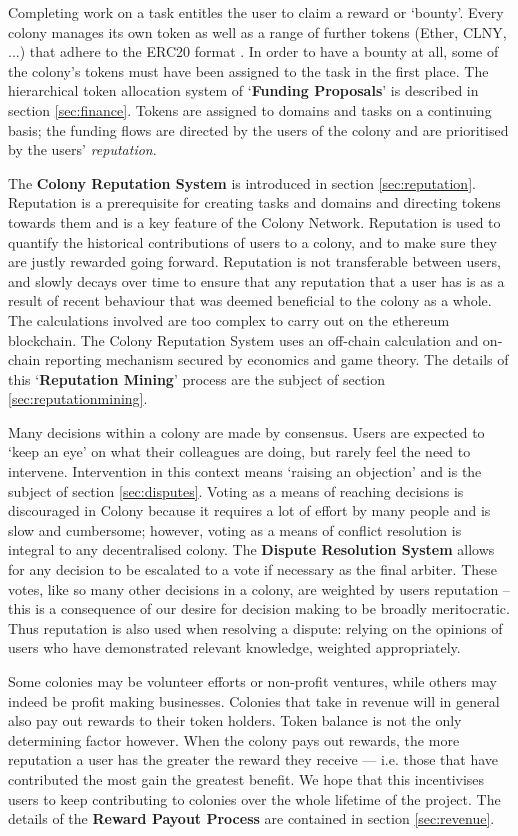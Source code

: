 Completing work on a task entitles the user to claim a reward or `bounty'. Every colony manages its own token as well as a range of further tokens (Ether, CLNY, ...) that adhere to the ERC20 format \cite{erc20}. In order to have a bounty at all, some of the colony's tokens must have been assigned to the task in the first place. The hierarchical token allocation system of `\textbf{Funding Proposals}' is described in section \ref{sec:finance}. Tokens are assigned to domains and tasks on a continuing basis; the funding flows are directed by the users of the colony and are prioritised by the users' \emph{reputation}. 

The \textbf{Colony Reputation System} is introduced in section \ref{sec:reputation}. Reputation is a prerequisite for creating tasks and domains and directing tokens towards them and is a key feature of the Colony Network. Reputation is used to quantify the historical contributions of users to a colony, and to make sure they are justly rewarded going forward. Reputation is not transferable between users, and slowly decays over time to ensure that any reputation that a user has is as a result of recent behaviour that was deemed beneficial to the colony as a whole. The calculations involved are too complex to carry out on the ethereum blockchain. The Colony Reputation System uses an off-chain calculation and on-chain reporting mechanism secured by economics and game theory. The details of this `\textbf{Reputation Mining}' process are the subject of section \ref{sec:reputationmining}.

Many decisions within a colony are made by consensus. Users are expected to `keep an eye' on what their colleagues are doing, but rarely feel the need to intervene. Intervention in this context means `raising an objection' and is the subject of section \ref{sec:disputes}. Voting as a means of reaching decisions is discouraged in Colony because it requires a lot of effort by many people and is slow and cumbersome; however, voting as a means of conflict resolution is integral to any decentralised colony. The \textbf{Dispute Resolution System} allows for any decision to be escalated to a vote if necessary as the final arbiter. These votes, like so many other decisions in a colony, are weighted by users reputation -- this is a consequence of our desire for decision making to be broadly meritocratic. Thus  reputation is also used when resolving a dispute: relying on the opinions of users who have demonstrated relevant knowledge, weighted appropriately. 

Some colonies may be volunteer efforts or non-profit ventures, while others may indeed be profit making businesses. Colonies that take in revenue will in general also pay out rewards to their token holders. Token balance is not the only determining factor however. When the colony pays out rewards, the more reputation a user has the greater the reward they receive --- i.e. those that have contributed the most gain the greatest benefit. We hope that this incentivises users to keep contributing to colonies over the whole lifetime of the project. The details of the \textbf{Reward Payout Process} are contained in section \ref{sec:revenue}.
